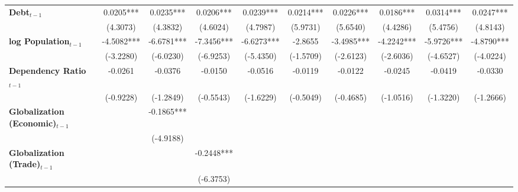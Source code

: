\begin{center}
\begin{tabular}{lccccccccc}
\textbf{Debt$_{t-1}$}                &     0.0205***      &     0.0235***      &     0.0206***      &     0.0239***      &     0.0214***      &     0.0226***      &     0.0186***      &     0.0314***      &     0.0247***       \\
\textbf{ }                         &      (4.3073)      &      (4.3832)      &      (4.6024)      &      (4.7987)      &      (5.9731)      &      (5.6540)      &      (4.4286)      &      (5.4756)      &      (4.8143)       \\
\textbf{log Population$_{t-1}$}      &     -4.5082***     &     -6.6781***     &     -7.3456***     &     -6.6273***     &      -2.8655       &     -3.4985***     &     -4.2242***     &     -5.9726***     &     -4.8790***      \\
\textbf{ }                         &     (-3.2280)      &     (-6.0230)      &     (-6.9253)      &     (-5.4350)      &     (-1.5709)      &     (-2.6123)      &     (-2.6036)      &     (-4.6527)      &     (-4.0224)       \\
\textbf{Dependency Ratio$_{t-1}$}   &      -0.0261       &      -0.0376       &      -0.0150       &      -0.0516       &      -0.0119       &      -0.0122       &      -0.0245       &      -0.0419       &      -0.0330        \\
\textbf{ }                         &     (-0.9228)      &     (-1.2849)      &     (-0.5543)      &     (-1.6229)      &     (-0.5049)      &     (-0.4685)      &     (-1.0516)      &     (-1.3220)      &     (-1.2666)       \\
\textbf{Globalization (Economic)$_{t-1}$}             &                    &     -0.1865***     &                    &                    &                    &                    &                    &                    &                     \\
\textbf{ }                         &                    &     (-4.9188)      &                    &                    &                    &                    &                    &                    &                     \\
\textbf{Globalization (Trade)$_{t-1}$}             &                    &                    &     -0.2448***     &                    &                    &                    &                    &                    &                     \\
\textbf{ }                         &                    &                    &     (-6.3753)      &                    &                    &                    &                    &                    &                     \\

\end{tabular}
\end{center}
